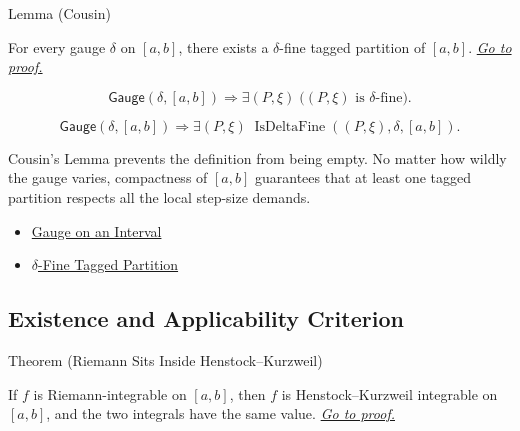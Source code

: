 \begin{lemmabox}{Lemma (Cousin)}
\begin{lemma}
\label{lem:cousin}
For every gauge \(\delta\) on \([a,b]\), there exists a \(\delta\)-fine tagged
partition of \([a,b]\).
\hyperref[prf:cousin]{\textit{Go to proof.}}
\end{lemma}
\end{lemmabox}

\begin{remark*}
\[
\mathsf{Gauge}(\delta,[a,b])
\Longrightarrow
\exists(P,\xi)\;\bigl((P,\xi)\text{ is }\delta\text{-fine}\bigr).
\]
\end{remark*}

\begin{remark*}
\[
\mathsf{Gauge}(\delta,[a,b])
\Longrightarrow
\exists(P,\xi)\;\operatorname{IsDeltaFine}((P,\xi),\delta,[a,b]).
\]
\end{remark*}

\begin{remark*}[Interpretation]
Cousin's Lemma prevents the definition from being empty. No matter how wildly
the gauge varies, compactness of \([a,b]\) guarantees that at least one tagged
partition respects all the local step-size demands.
\end{remark*}

\begin{dependencies}
\begin{itemize}
  \item \hyperref[def:gauge-on-interval]{Gauge on an Interval}
  \item \hyperref[def:delta-fine-tagged-partition]{\(\delta\)-Fine Tagged Partition}
\end{itemize}
\end{dependencies}

\subsection*{Existence and Applicability Criterion}

\begin{theorembox}{Theorem (Riemann Sits Inside Henstock--Kurzweil)}
\begin{theorem}
\label{thm:riemann-integrable-implies-hk-integrable}
If \(f\) is Riemann-integrable on \([a,b]\), then \(f\) is
Henstock--Kurzweil integrable on \([a,b]\), and the two integrals have the
same value.
\hyperref[prf:riemann-integrable-implies-hk-integrable]{\textit{Go to proof.}}
\end{theorem}
\end{theorembox}

